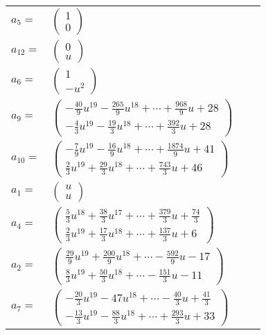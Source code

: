 \documentclass[1p]{elsarticle_modified}
\theoremstyle{definition}
\begin{document}
\begin{tabular}{m{7pt} m{180pt} m{7pt} m{180pt} }
\flushright $a_{5}=$&$\begin{pmatrix}1\\0\end{pmatrix}$ \\
\flushright $a_{12}=$&$\begin{pmatrix}0\\u\end{pmatrix}$ \\
\flushright $a_{6}=$&$\begin{pmatrix}1\\- u^2\end{pmatrix}$ \\
\flushright $a_{9}=$&$\begin{pmatrix}-\frac{40}{9} u^{19}-\frac{265}{9} u^{18}+\cdots+\frac{968}{9} u+28\\-\frac{4}{3} u^{19}-\frac{19}{3} u^{18}+\cdots+\frac{392}{3} u+28\end{pmatrix}$ \\
\flushright $a_{10}=$&$\begin{pmatrix}-\frac{7}{9} u^{19}-\frac{16}{9} u^{18}+\cdots+\frac{1874}{9} u+41\\\frac{2}{3} u^{19}+\frac{29}{3} u^{18}+\cdots+\frac{743}{3} u+46\end{pmatrix}$ \\
\flushright $a_{1}=$&$\begin{pmatrix}u\\u\end{pmatrix}$ \\
\flushright $a_{4}=$&$\begin{pmatrix}\frac{5}{3} u^{18}+\frac{38}{3} u^{17}+\cdots+\frac{379}{3} u+\frac{74}{3}\\\frac{2}{3} u^{19}+\frac{17}{3} u^{18}+\cdots+\frac{137}{3} u+6\end{pmatrix}$ \\
\flushright $a_{2}=$&$\begin{pmatrix}\frac{29}{9} u^{19}+\frac{200}{9} u^{18}+\cdots-\frac{592}{9} u-17\\\frac{8}{3} u^{19}+\frac{50}{3} u^{18}+\cdots-\frac{151}{3} u-11\end{pmatrix}$ \\
\flushright $a_{7}=$&$\begin{pmatrix}-\frac{20}{3} u^{19}-47 u^{18}+\cdots-\frac{40}{3} u+\frac{41}{3}\\-\frac{13}{3} u^{19}-\frac{88}{3} u^{18}+\cdots+\frac{293}{3} u+33\end{pmatrix}$ \\

\end{tabular}
\end{document}
